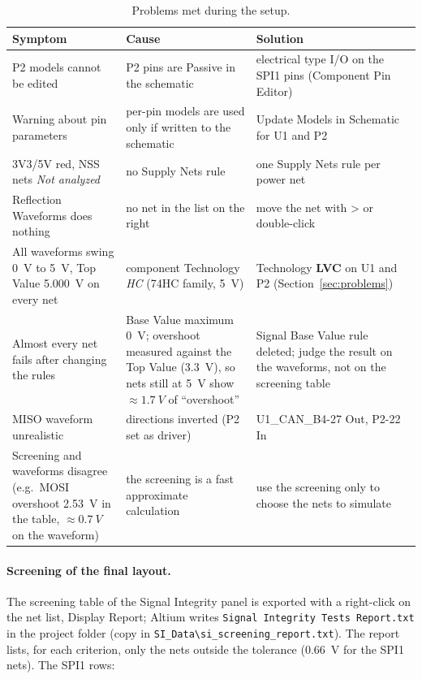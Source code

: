 \documentclass[11pt,a4paper]{article}
\newcommand{\gui}[1]{\textsf{#1}}
\begin{document}
\begin{table}[H]
\centering
\begin{tabular}{>{\raggedright\arraybackslash}p{}>{\raggedright\arraybackslash}p{}>{\raggedright\arraybackslash}p{}}
\toprule
Symptom & Cause & Solution \\
\midrule
P2 models cannot be edited & P2 pins are Passive in the schematic & electrical type I/O on the SPI1 pins (Component Pin Editor) \\
Warning about pin parameters & per-pin models are used only if written to the schematic & \gui{Update Models in Schematic} for U1 and P2 \\
3V3/5V red, NSS nets \textit{Not analyzed} & no Supply Nets rule & one Supply Nets rule per power net \\
\gui{Reflection Waveforms} does nothing & no net in the list on the right & move the net with \gui{>} or double-click \\
All waveforms swing \qty{0}{V} to \qty{5}{V}, Top Value \qty{5.000}{V} on every net & component Technology \textit{HC} (74HC family, \qty{5}{V}) & Technology \textbf{LVC} on U1 and P2 (Section~\ref{sec:problems}) \\
Almost every net fails after changing the rules & Base Value maximum \qty{0}{V}; overshoot measured against the Top Value (\qty{3.3}{V}), so nets still at \qty{5}{V} show $\approx\qty{1.7}{V}$ of ``overshoot'' & Signal Base Value rule deleted; judge the result on the waveforms, not on the screening table \\
MISO waveform unrealistic & directions inverted (P2 set as driver) & U1\_CAN\_B4-27 Out, P2-22 In \\
Screening and waveforms disagree (e.g.\ MOSI overshoot \qty{2.53}{V} in the table, $\approx\qty{0.7}{V}$ on the waveform) & the screening is a fast approximate calculation & use the screening only to choose the nets to simulate \\
\bottomrule
\end{tabular}
\caption{Problems met during the setup.}
\label{tab:problems}
\end{table}

\paragraph{Screening of the final layout.} The screening table of the Signal Integrity panel is exported
with a right-click on the net list, \gui{Display Report}; Altium writes \texttt{Signal Integrity Tests
Report.txt} in the project folder (copy in \texttt{SI\_Data\textbackslash si\_screening\_report.txt}). The report
lists, for each criterion, only the nets outside the tolerance (\qty{0.66}{V} for the SPI1 nets). The SPI1
rows:
\end{document}
